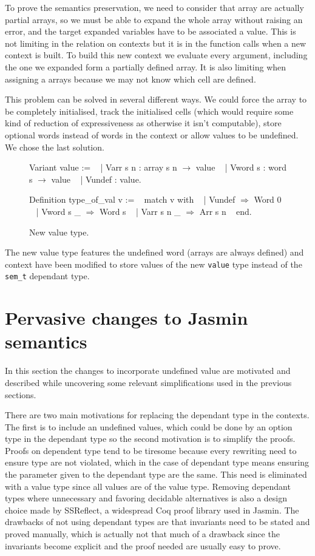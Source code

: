 \documentclass{article}
\begin{document}
\medskip

To prove the semantics preservation, we need to consider that array are actually
partial arrays, so we must be able to expand the whole array without raising an
error, and the target expanded variables have to be associated a value. This is
not limiting in the relation on contexts but it is in the function calls when a
new context is built. To build this new context we evaluate every argument,
including the one we expanded form a partially defined array. It is also
limiting when assigning a arrays because we may not know which cell are defined.

This problem can be solved in several different ways. We could force the array
to be completely initialised, track the initialised cells (which would require
some kind of reduction of expressiveness as otherwise it isn't computable),
store optional words instead of words in the context or allow values to be
undefined. We chose the last solution.

\smallskip

\begin{figure}[t]
\obeylines\obeyspaces\ttfamily%
Variant value :=
~ | Varr s n : array s n \(\rightarrow\) value
~ | Vword s  : word  s   \(\rightarrow\) value
~ | Vundef   :              value.

Definition type\_of\_val v :=
~ match v with
~ | Vundef     \(\Rightarrow\) Word 0
~ | Vword s  \_ \(\Rightarrow\) Word s
~ | Varr s n \_ \(\Rightarrow\) Arr s n
~ end.
\normalfont%
\caption{New value type.}
\end{figure}

The new value type features the undefined word (arrays are always defined) and
context have been modified to store values of the new \texttt{value} type
instead of the \texttt{sem\_t} dependant type.


\section{Pervasive changes to Jasmin semantics}\label{sec:perch}

In this section the changes to incorporate undefined value are motivated and
described while uncovering some relevant simplifications used in the previous
sections.

There are two main motivations for replacing the dependant type in the contexts.
The first is to include an undefined values, which could be done by an option
type in the dependant type so the second motivation is to simplify the proofs.
Proofs on dependent type tend to be tiresome because every rewriting need to
ensure type are not violated, which in the case of dependant type means ensuring
the parameter given to the dependant type are the same. This need is eliminated
with a value type since all values are of the value type. Removing dependant
types where unnecessary and favoring decidable alternatives is also a design
choice made by SSReflect, a widespread Coq proof library used in Jasmin. The
drawbacks of not using dependant types are that invariants need to be stated and
proved manually, which is actually not that much of a drawback since the
invariants become explicit and the proof needed are usually easy to prove.
\end{document}
